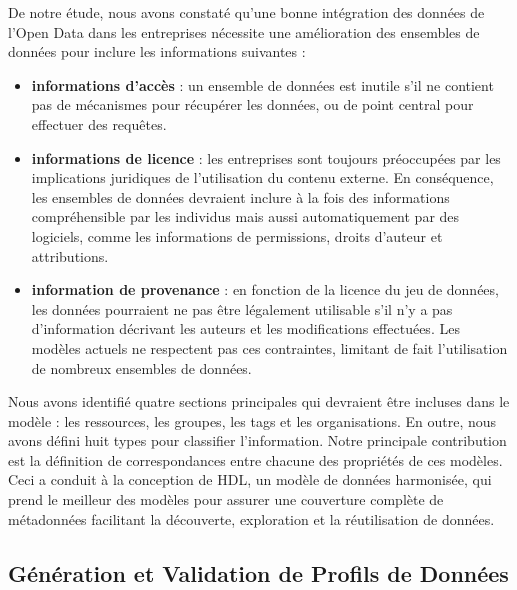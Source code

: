 De notre \'{e}tude, nous avons constat\'{e} qu'une bonne int\'{e}gration des donn\'{e}es de l'Open Data dans les entreprises n\'{e}cessite une am\'{e}lioration des ensembles de donn\'{e}es pour inclure les informations suivantes :
\begin{itemize}
	\item\textbf{informations d'acc\`{e}s} : un ensemble de donn\'{e}es est inutile s'il ne contient pas de m\'{e}canismes pour r\'{e}cup\'{e}rer les donn\'{e}es, ou de point central pour effectuer des requ\^{e}tes.
	\item\textbf{informations de licence} : les entreprises sont toujours pr\'{e}occup\'{e}es par les implications juridiques de l'utilisation du contenu externe. En cons\'{e}quence, les ensembles de donn\'{e}es devraient inclure \`{a} la fois des informations compr\'{e}hensible par les individus mais aussi automatiquement par des logiciels, comme les informations de permissions, droits d'auteur et attributions.
	\item\textbf{information de provenance} : en fonction de la licence du jeu de donn\'{e}es, les donn\'{e}es pourraient ne pas \^{e}tre l\'{e}galement utilisable s'il n'y a pas d'information d\'{e}crivant les auteurs et les modifications effectu\'{e}es. Les mod\`{e}les actuels ne respectent pas ces contraintes, limitant de fait l'utilisation de nombreux ensembles de donn\'{e}es.
\end{itemize}

Nous avons identifi\'{e} quatre sections principales qui devraient \^{e}tre incluses dans le mod\`{e}le : les ressources, les groupes, les tags et les organisations. En outre, nous avons d\'{e}fini huit types pour classifier l'information. Notre principale contribution est la d\'{e}finition de correspondances entre chacune des propri\'{e}t\'{e}s de ces mod\`{e}les. Ceci a conduit \`{a} la conception de HDL, un mod\`{e}le de donn\'{e}es harmonis\'{e}e, qui prend le meilleur des mod\`{e}les pour assurer une couverture compl\`{e}te de m\'{e}tadonn\'{e}es facilitant la d\'{e}couverte, exploration et la r\'{e}utilisation de donn\'{e}es.

\subsection{G\'{e}n\'{e}ration et Validation de Profils de Donn\'{e}es}


